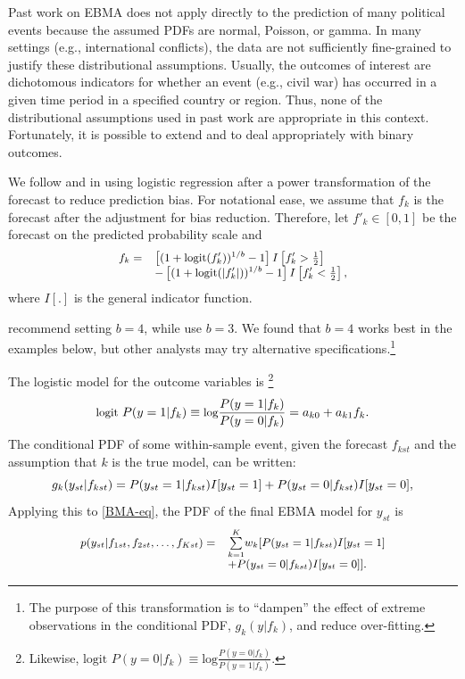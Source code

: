 \documentclass[pdftex,12pt,fullpage,oneside]{amsart}
\begin{document}
Past work on EBMA does not apply directly to the prediction of many
political events because the assumed PDFs are normal, Poisson, or
gamma. In many  settings (e.g., international conflicts), the data
are not sufficiently fine-grained to justify these distributional
assumptions.  Usually, the outcomes of interest are dichotomous
indicators for whether an event (e.g., civil war) has occurred in a
given time period in a specified country or region. Thus, none of the
distributional assumptions used in past work are appropriate in this
context.  Fortunately, it is possible to extend \citet{Sloughter:2007}
and \citet{Sloughter:2010} to deal appropriately with binary outcomes.

We follow \citet{Sloughter:2007} and \citet{Hamill:2004} in using
logistic regression after a power transformation of the forecast to
reduce prediction bias. For notational ease, we assume that $f_k$ is the
forecast after the adjustment for bias reduction.  Therefore, let
$f'_k \in [0,1]$ be the forecast on the predicted probability scale
 and
\begin{equation}
\small
\begin{array}{rl}
f_k = & \left[(1+\mbox{logit}(f'_k))^{1/b} - 1\right]I\left[f'_k>\frac{1}{2}\right] \\
& - \left[(1+\mbox{logit}(|f'_k|))^{1/b} -  1\right]I\left[f'_k<\frac{1}{2}\right],\\
\end{array}
 \end{equation}
\noindent where $I[.]$ is the general indicator function.

\citet{Hamill:2004} recommend setting $b=4$, while
\citet{Sloughter:2007} use $b=3$.  We found that $b=4$ works best in
the examples below, but other analysts may try alternative
specifications.\footnote{The purpose of this transformation is to ``dampen''
the effect of extreme observations in the conditional PDF, $g_k(y|f_k)$,
and reduce over-fitting.}

The logistic model for the outcome variables is \footnote{Likewise, $\mbox{logit } P(y=0|f_k) \equiv
 \mbox{log}\frac{P(y=0|f_k)}{P(y=1|f_k)}$.}
\begin{equation} \small
\label{one}
\mbox{logit } P(y=1|f_k) \equiv \mbox{log}\frac{P(y=1|f_k)}{P(y=0|f_k)} = a_{k0}+a_{k1}f_k .
\end{equation}
\noindent The conditional PDF of some within-sample event, given the
forecast $f_{kst}$ and the assumption that $k$ is the true model, can
be written:
\begin{equation} 
\label{component-eq}
\small
g_k(y_{st}|f_{kst}) = P(y_{st}=1|f_{kst})I[y_{st}=1]  + P(y_{st}=0|f_{kst})I[y_{st}=0],
\end{equation}
Applying this to \eqref{BMA-eq}, the PDF of the final EBMA model for
$y_{st}$ is
\begin{equation}
\label{pdf}
\small
\begin{array}{rl}
p(y_{st}|f_{1st}, f_{2st}, \ldots, f_{Kst}) = &
\overset{K}{\underset{k=1}{\sum}} w_k [
P(y_{st}=1|f_{kst})I[y_{st}=1] \\
& + P(y_{st}=0|f_{kst})I[y_{st}=0]].\end{array}
\end{equation}
\end{document}
